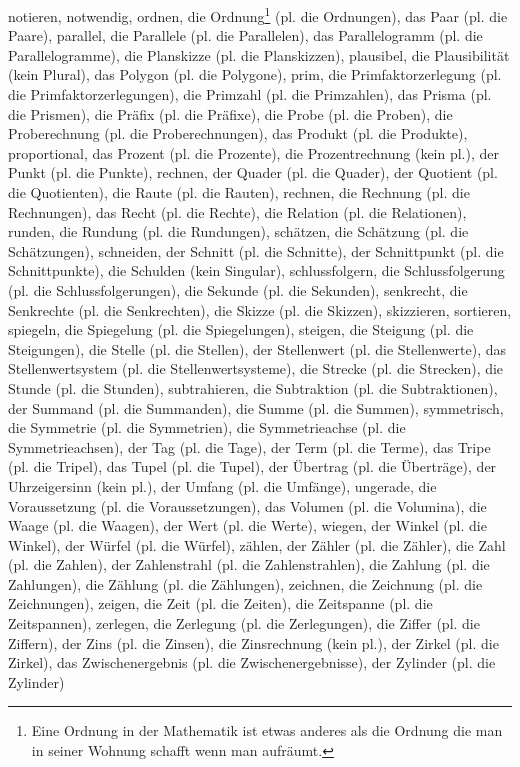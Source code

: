 notieren,
notwendig,
ordnen,
die Ordnung\footnote{Eine Ordnung in der Mathematik ist etwas anderes als die Ordnung die man in seiner Wohnung schafft wenn man aufräumt.} (pl. die Ordnungen),
das Paar (pl. die Paare),
parallel,
die Parallele (pl. die Parallelen),
das Parallelogramm (pl. die Parallelogramme),
die Planskizze (pl. die Planskizzen),
plausibel,
die Plausibilität (kein Plural),
das Polygon (pl. die Polygone),
prim,
die Primfaktorzerlegung (pl. die Primfaktorzerlegungen),
die Primzahl (pl. die Primzahlen),
das Prisma (pl. die Prismen),
die Präfix (pl. die Präfixe),
die Probe (pl. die Proben),
die Proberechnung (pl. die Proberechnungen),
das Produkt (pl. die Produkte),
proportional,
das Prozent (pl. die Prozente),
die Prozentrechnung (kein pl.),
der Punkt (pl. die Punkte),
rechnen,
der Quader (pl. die Quader),
der Quotient (pl. die Quotienten),
die Raute (pl. die Rauten),
rechnen,
die Rechnung (pl. die Rechnungen),
das Recht (pl. die Rechte),
die Relation (pl. die Relationen),
runden,
die Rundung (pl. die Rundungen),
schätzen,
die Schätzung (pl. die Schätzungen),
schneiden,
der Schnitt (pl. die Schnitte),
der Schnittpunkt (pl. die Schnittpunkte),
die Schulden (kein Singular),
schlussfolgern,
die Schlussfolgerung (pl. die Schlussfolgerungen),
die Sekunde (pl. die Sekunden),
senkrecht,
die Senkrechte (pl. die Senkrechten),
die Skizze (pl. die Skizzen),
skizzieren,
sortieren,
spiegeln,
die Spiegelung (pl. die Spiegelungen),
steigen,
die Steigung (pl. die Steigungen),
die Stelle (pl. die Stellen),
der Stellenwert (pl. die Stellenwerte),
das Stellenwertsystem (pl. die Stellenwertsysteme),
die Strecke (pl. die Strecken),
die Stunde (pl. die Stunden),
subtrahieren,
die Subtraktion (pl. die Subtraktionen),
der Summand (pl. die Summanden),
die Summe (pl. die Summen),
symmetrisch,
die Symmetrie (pl. die Symmetrien),
die Symmetrieachse (pl. die Symmetrieachsen),
der Tag (pl. die Tage),
der Term (pl. die Terme),
das Tripe (pl. die Tripel),
das Tupel (pl. die Tupel),
der Übertrag (pl. die Überträge),
der Uhrzeigersinn (kein pl.),
der Umfang (pl. die Umfänge),
ungerade,
die Voraussetzung (pl. die Voraussetzungen),
das Volumen (pl. die Volumina),
die Waage (pl. die Waagen),
der Wert (pl. die Werte),
wiegen,
der Winkel (pl. die Winkel),
der Würfel (pl. die Würfel),
zählen,
der Zähler (pl. die Zähler),
die Zahl (pl. die Zahlen),
der Zahlenstrahl (pl. die Zahlenstrahlen),
die Zahlung (pl. die Zahlungen),
die Zählung (pl. die Zählungen),
zeichnen,
die Zeichnung (pl. die Zeichnungen),
zeigen,
die Zeit (pl. die Zeiten),
die Zeitspanne (pl. die Zeitspannen),
zerlegen,
die Zerlegung (pl. die Zerlegungen),
die Ziffer (pl. die Ziffern),
der Zins (pl. die Zinsen),
die Zinsrechnung (kein pl.),
der Zirkel (pl. die Zirkel),
das Zwischenergebnis (pl. die Zwischenergebnisse),
der Zylinder (pl. die Zylinder)

